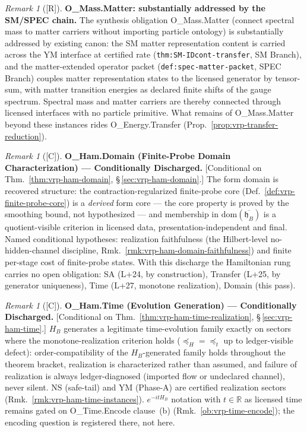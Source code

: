 \documentclass[12pt,oneside]{amsbook}
\theoremstyle{plain}
\theoremstyle{definition}
\theoremstyle{remark}
\newtheorem{remark}[theorem]{Remark}
\newcommand{\status}[1]{\textup{[#1]}}
\begin{document}
\begin{remark}[\status{R}]\label{rmk:vrp-mass-matter}
\textbf{O\_Mass.Matter: substantially addressed by the SM/SPEC
chain.}
The synthesis obligation O\_Mass.Matter (connect spectral mass to
matter carriers without importing particle ontology) is
substantially addressed by existing canon: the SM matter
representation content is carried across the YM interface at
certified rate (\texttt{thm:SM-IDcont-transfer}, SM Branch), and
the matter-extended operator packet
(\texttt{def:spec-matter-packet}, SPEC Branch) couples matter
representation states to the licensed generator by tensor-sum,
with matter transition energies as declared finite shifts of the
gauge spectrum.  Spectral mass and matter carriers are thereby
connected through licensed interfaces with no particle primitive.
What remains of O\_Mass.Matter beyond these instances rides
O\_Energy.Transfer (Prop.~\ref{prop:vrp-transfer-reduction}).
\end{remark}

\begin{remark}[\status{C}]\label{ob:vrp-ham-domain}
\textbf{O\_Ham.Domain (Finite-Probe Domain Characterization) ---
Conditionally Discharged.}
\textup{[Conditional on Thm.~\ref{thm:vrp-ham-domain},
\S\,\ref{sec:vrp-ham-domain}.]}
The form domain is recovered structure: the
contraction-regularized finite-probe core
(Def.~\ref{def:vrp-finite-probe-core}) is a \emph{derived} form
core --- the core property is proved by the smoothing bound, not
hypothesized --- and membership in
$\mathrm{dom}(\overline{\mathfrak{h}_B})$ is a quotient-visible
criterion in licensed data, presentation-independent and final.
Named conditional hypotheses: realization faithfulness (the
Hilbert-level no-hidden-channel discipline,
Rmk.~\ref{rmk:vrp-ham-domain-faithfulness}) and finite per-stage
cost of finite-probe states.  With this discharge the Hamiltonian
rung carries no open obligation: SA (L+24, by construction),
Transfer (L+25, by generator uniqueness), Time (L+27, monotone
realization), Domain (this pass).
\end{remark}

\begin{remark}[\status{C}]\label{ob:vrp-ham-time}
\textbf{O\_Ham.Time (Evolution Generation) --- Conditionally
Discharged.}
\textup{[Conditional on Thm.~\ref{thm:vrp-ham-time-realization},
\S\,\ref{sec:vrp-ham-time}.]}
$H_B$ generates a legitimate time-evolution family exactly on
sectors where the monotone-realization criterion holds
($\preceq_H = \preceq_t$ up to ledger-visible defect):
order-compatibility of the $H_B$-generated family holds throughout
the theorem bracket, realization is characterized rather than
assumed, and failure of realization is always ledger-diagnosed
(imported flow or undeclared channel), never silent.  NS
(safe-tail) and YM (Phase-A) are certified realization sectors
(Rmk.~\ref{rmk:vrp-ham-time-instances}).  $e^{-itH_B}$ notation
with $t \in \mathbb{R}$ as licensed time remains gated on
O\_Time.Encode clause~(b) (Rmk.~\ref{ob:vrp-time-encode}); the
encoding question is registered there, not here.
\end{remark}
\end{document}
